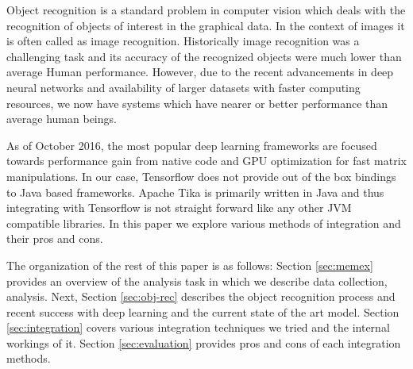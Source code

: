 Object recognition is a standard problem in computer vision which deals with the recognition of objects of interest in the graphical data. In the context of images it is often called as image recognition. Historically image recognition was a challenging task and its accuracy of the recognized objects were much lower than average Human performance. However, due to the recent advancements in deep neural networks and availability of larger datasets with faster computing resources, we now have systems which have nearer or better performance than average human beings\cite{karpathy-cnn-compare}.



As of October 2016, the most popular deep learning frameworks are focused towards performance gain from native code and GPU optimization for fast matrix manipulations. In our case, Tensorflow does not provide out of the box bindings to Java based frameworks. Apache Tika is primarily written in Java and thus integrating with Tensorflow is not straight forward like any other JVM compatible libraries. In this paper we explore various methods of integration and their pros and cons.

The organization of the rest of this paper is as follows: Section \ref{sec:memex} provides an overview of the analysis task in which we describe data collection, analysis. Next, Section \ref{sec:obj-rec} describes the object recognition process and recent success with deep learning and the current state of the art model. Section \ref{sec:integration} covers various integration techniques we tried and the internal workings of it. Section \ref{sec:evaluation} provides pros and cons of each integration methods.
